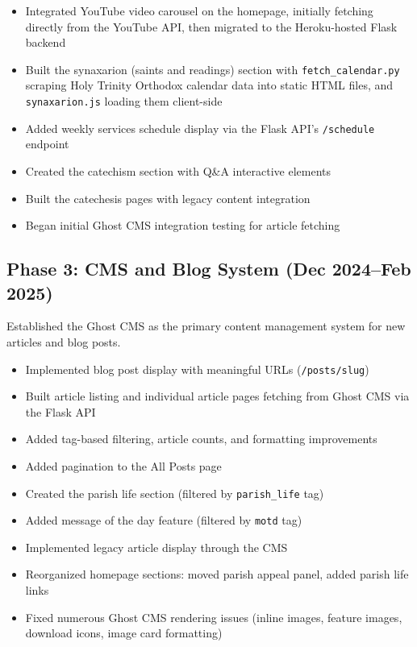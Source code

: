 \documentclass[12pt]{article}
\begin{document}
\begin{itemize}
    \item Integrated YouTube video carousel on the homepage, initially fetching directly from the YouTube API, then migrated to the Heroku-hosted Flask backend
    \item Built the synaxarion (saints and readings) section with \texttt{fetch\_calendar.py} scraping Holy Trinity Orthodox calendar data into static HTML files, and \texttt{synaxarion.js} loading them client-side
    \item Added weekly services schedule display via the Flask API's \texttt{/schedule} endpoint
    \item Created the catechism section with Q\&A interactive elements
    \item Built the catechesis pages with legacy content integration
    \item Began initial Ghost CMS integration testing for article fetching
\end{itemize}

\subsection{Phase 3: CMS and Blog System (Dec 2024--Feb 2025)}

Established the Ghost CMS as the primary content management system for new articles and blog posts.

\begin{itemize}
    \item Implemented blog post display with meaningful URLs (\texttt{/posts/slug})
    \item Built article listing and individual article pages fetching from Ghost CMS via the Flask API
    \item Added tag-based filtering, article counts, and formatting improvements
    \item Added pagination to the All Posts page
    \item Created the parish life section (filtered by \texttt{parish\_life} tag)
    \item Added message of the day feature (filtered by \texttt{motd} tag)
    \item Implemented legacy article display through the CMS
    \item Reorganized homepage sections: moved parish appeal panel, added parish life links
    \item Fixed numerous Ghost CMS rendering issues (inline images, feature images, download icons, image card formatting)
\end{itemize}
\end{document}
